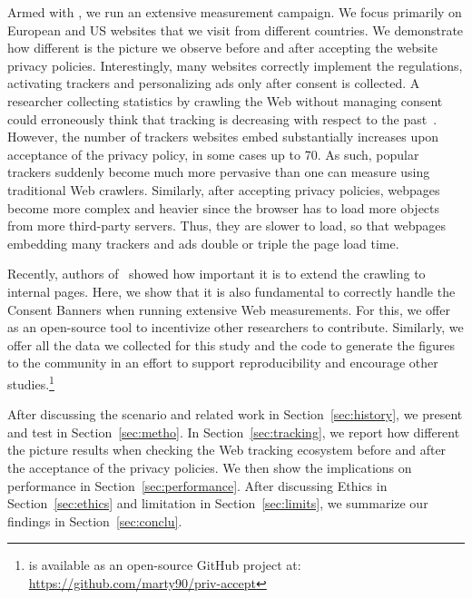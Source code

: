 Armed with \TOOL, we run an extensive measurement campaign. We focus primarily on European and US websites that we visit from different countries. We demonstrate how different is the picture we observe before and after accepting the website privacy policies. Interestingly, many websites correctly implement the regulations, activating trackers and personalizing ads only after consent is collected. A researcher collecting statistics by crawling the Web without managing consent could erroneously think that tracking is decreasing with respect to the past~\cite{hu2019characterising}. However, the number of trackers websites embed substantially increases upon acceptance of the privacy policy, in some cases up to 70. As such, popular trackers suddenly become much more pervasive than one can measure using traditional Web crawlers. Similarly, after accepting privacy policies, webpages become more complex and heavier since the browser has to load more objects from more third-party servers. Thus, they are slower to load, so that webpages embedding many trackers and ads double or triple the page load time.

Recently, authors of~\cite{aqeel2020on} showed how important it is to extend the crawling to internal pages. Here, we show that it is also fundamental to correctly handle the Consent Banners when running extensive Web measurements. For this, we offer \TOOL as an open-source tool to incentivize other researchers to contribute. Similarly, we offer all the data we collected for this study and the code to generate the figures to the community in an effort to support reproducibility and encourage other studies.\footnote{\TOOL is available as an open-source GitHub project at: \url{https://github.com/marty90/priv-accept}}

After discussing the scenario and related work in Section~\ref{sec:history}, we present and test \TOOL in Section~\ref{sec:metho}. In Section~\ref{sec:tracking}, we report how different the picture results when checking the Web tracking ecosystem before and after the acceptance of the privacy policies. We then show the implications on performance in Section~\ref{sec:performance}. After discussing Ethics in Section~\ref{sec:ethics} and limitation in Section~\ref{sec:limits}, we summarize our findings in Section~\ref{sec:conclu}.